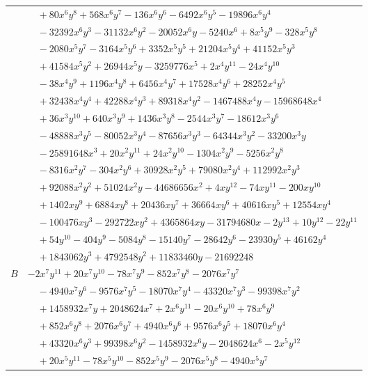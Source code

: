 \documentclass[11pt]{article}
\begin{document}
\begin{longtable}{@{}ll@{}}
 & $\quad +80x^{6}y^{8}+568x^{6}y^{7}-136x^{6}y^{6}-6492x^{6}y^{5}-19896x^{6}y^{4}$\\
 & $\quad -32392x^{6}y^{3}-31132x^{6}y^{2}-20052x^{6}y-5240x^{6}+8x^{5}y^{9}-328x^{5}y^{8}$\\
 & $\quad -2080x^{5}y^{7}-3164x^{5}y^{6}+3352x^{5}y^{5}+21204x^{5}y^{4}+41152x^{5}y^{3}$\\
 & $\quad +41584x^{5}y^{2}+26944x^{5}y-3259776x^{5}+2x^{4}y^{11}-24x^{4}y^{10}$\\
 & $\quad -38x^{4}y^{9}+1196x^{4}y^{8}+6456x^{4}y^{7}+17528x^{4}y^{6}+28252x^{4}y^{5}$\\
 & $\quad +32438x^{4}y^{4}+42288x^{4}y^{3}+89318x^{4}y^{2}-1467488x^{4}y-15968648x^{4}$\\
 & $\quad +36x^{3}y^{10}+640x^{3}y^{9}+1436x^{3}y^{8}-2544x^{3}y^{7}-18612x^{3}y^{6}$\\
 & $\quad -48888x^{3}y^{5}-80052x^{3}y^{4}-87656x^{3}y^{3}-64344x^{3}y^{2}-33200x^{3}y$\\
 & $\quad -25891648x^{3}+20x^{2}y^{11}+24x^{2}y^{10}-1304x^{2}y^{9}-5256x^{2}y^{8}$\\
 & $\quad -8316x^{2}y^{7}-304x^{2}y^{6}+30928x^{2}y^{5}+79080x^{2}y^{4}+112992x^{2}y^{3}$\\
 & $\quad +92088x^{2}y^{2}+51024x^{2}y-44686656x^{2}+4xy^{12}-74xy^{11}-200xy^{10}$\\
 & $\quad +1402xy^{9}+6884xy^{8}+20436xy^{7}+36664xy^{6}+40616xy^{5}+12554xy^{4}$\\
 & $\quad -100476xy^{3}-292722xy^{2}+4365864xy-31794680x-2y^{13}+10y^{12}-22y^{11}$\\
 & $\quad +54y^{10}-404y^{9}-5084y^{8}-15140y^{7}-28642y^{6}-23930y^{5}+46162y^{4}$\\
 & $\quad +1843062y^{3}+4792548y^{2}+11833460y-21692248$\\
$B$ & $-2x^{7}y^{11}+20x^{7}y^{10}-78x^{7}y^{9}-852x^{7}y^{8}-2076x^{7}y^{7}$\\
 & $\quad -4940x^{7}y^{6}-9576x^{7}y^{5}-18070x^{7}y^{4}-43320x^{7}y^{3}-99398x^{7}y^{2}$\\
 & $\quad +1458932x^{7}y+2048624x^{7}+2x^{6}y^{11}-20x^{6}y^{10}+78x^{6}y^{9}$\\
 & $\quad +852x^{6}y^{8}+2076x^{6}y^{7}+4940x^{6}y^{6}+9576x^{6}y^{5}+18070x^{6}y^{4}$\\
 & $\quad +43320x^{6}y^{3}+99398x^{6}y^{2}-1458932x^{6}y-2048624x^{6}-2x^{5}y^{12}$\\
 & $\quad +20x^{5}y^{11}-78x^{5}y^{10}-852x^{5}y^{9}-2076x^{5}y^{8}-4940x^{5}y^{7}$\\

\end{longtable}
\end{document}
